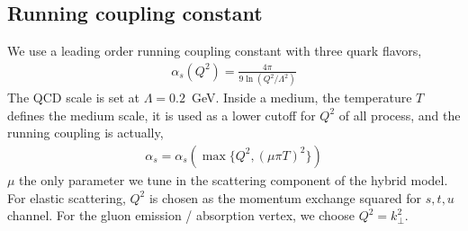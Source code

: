 \documentclass[aps, prc, reprint, amsmath, groupedaddress, nofootinbib]{revtex4-1}
\begin{document}
\begin{appendices}
\section{Running coupling constant}
\label{appendix:alphas}
We use a leading order running coupling constant with three  quark flavors,
\begin{eqnarray}
\alpha_s(Q^2) = \frac{4\pi}{9 \ln\left(Q^2/\Lambda^2\right) }
\end{eqnarray}
The QCD scale is set at $\Lambda = 0.2$~GeV.
Inside a medium, the temperature $T$ defines the medium scale, it is used as a lower cutoff for $Q^2$ of all process, and the running coupling is actually,
\begin{eqnarray}
\alpha_s = \alpha_s(\max\{Q^2,(\mu\pi T)^2\})
\end{eqnarray}
$\mu$ the only parameter we tune in the scattering component of the hybrid model.
For elastic scattering, $Q^2$ is chosen as the momentum exchange squared for $s,t,u$ channel.
For the gluon emission / absorption vertex, we choose $Q^2 = k_\perp^2$.

\end{appendices}
\end{document}
